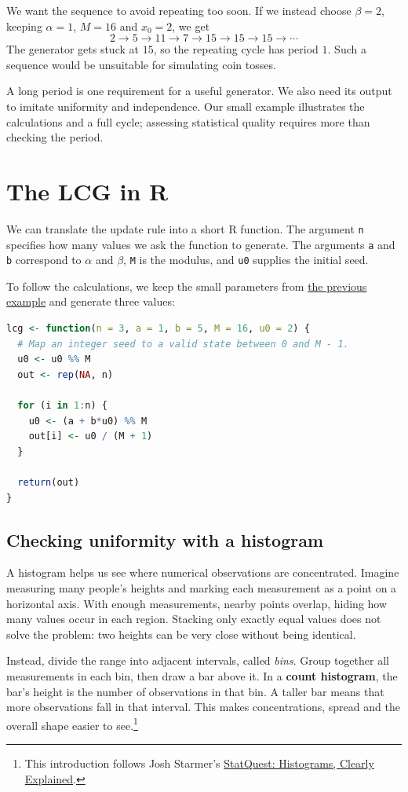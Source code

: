 \documentclass[a4paper,12pt,oneside]{report}
\begin{document}
\begin{notebox}
We want the sequence to avoid repeating too soon. If we instead
choose $\beta=2$, keeping $\alpha=1$, $M=16$ and $x_0=2$, we get
\[
  2\to5\to11\to7\to15\to15\to15\to\cdots
\]
The generator gets stuck at $15$, so the repeating cycle has period
$1$. Such a sequence would be unsuitable for simulating coin tosses.

A long period is one requirement for a useful generator. We also
need its output to imitate uniformity and independence. Our small
example illustrates the calculations and a full cycle; assessing
statistical quality requires more than checking the period.
\end{notebox}


\section{The LCG in R}
\label{sec:lcg-r}
We can translate the update rule into a short R function.
The argument \texttt{n} specifies how many values we ask the function
to generate. The arguments \texttt{a} and \texttt{b} correspond to
$\alpha$ and $\beta$, \texttt{M} is the modulus, and \texttt{u0}
supplies the initial seed.

To follow the calculations, we keep the small parameters from
\hyperref[sec:lcg]{the previous example} and generate three values:
\begin{lstlisting}[language=R]
lcg <- function(n = 3, a = 1, b = 5, M = 16, u0 = 2) {
  # Map an integer seed to a valid state between 0 and M - 1.
  u0 <- u0 %% M
  out <- rep(NA, n)

  for (i in 1:n) {
    u0 <- (a + b*u0) %% M
    out[i] <- u0 / (M + 1)
  }

  return(out)
}
\end{lstlisting}
\subsection{Checking uniformity with a histogram}
A histogram helps us see where numerical observations are concentrated.
Imagine measuring many people's heights and marking each measurement
as a point on a horizontal axis. With enough measurements, nearby
points overlap, hiding how many values occur in each region.
Stacking only exactly equal values does not solve the problem:
two heights can be very close without being identical.

Instead, divide the range into adjacent intervals, called \emph{bins}.
Group together all measurements in each bin, then draw a bar above it.
In a \textbf{count histogram}, the bar's height is the number of
observations in that bin. A taller bar means that more observations
fall in that interval. This makes concentrations, spread and the
overall shape easier to see.\footnote{This introduction follows
Josh Starmer's \href{https://www.youtube.com/watch?v=qBigTkBLU6g}
{StatQuest: Histograms, Clearly Explained}.}
\end{document}

